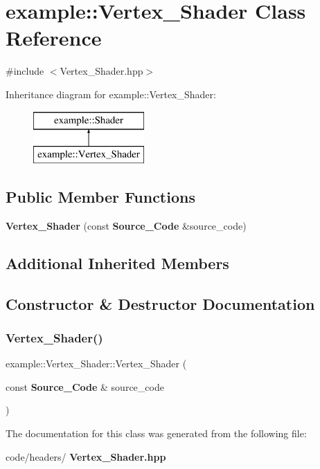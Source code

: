 \section{example\+::Vertex\+\_\+\+Shader Class Reference}
\label{classexample_1_1_vertex___shader}


{\ttfamily \#include $<$Vertex\+\_\+\+Shader.\+hpp$>$}

Inheritance diagram for example\+::Vertex\+\_\+\+Shader\+:\begin{figure}[H]
\begin{center}
\leavevmode
\includegraphics[height=2.000000cm]{classexample_1_1_vertex___shader}
\end{center}
\end{figure}
\subsection*{Public Member Functions}
\begin{DoxyCompactItemize}
\item 
\textbf{ Vertex\+\_\+\+Shader} (const \textbf{ Source\+\_\+\+Code} \&source\+\_\+code)
\end{DoxyCompactItemize}
\subsection*{Additional Inherited Members}


\subsection{Constructor \& Destructor Documentation}
\mbox{\label{classexample_1_1_vertex___shader_a4c9c616101a9c97e61a2e5c1563cdda7}} 
\subsubsection{Vertex\_Shader()}
{\footnotesize\ttfamily example\+::\+Vertex\+\_\+\+Shader\+::\+Vertex\+\_\+\+Shader (\begin{DoxyParamCaption}\item[{const \textbf{ Source\+\_\+\+Code} \&}]{source\+\_\+code }\end{DoxyParamCaption})\hspace{0.3cm}{\ttfamily [inline]}}



The documentation for this class was generated from the following file\+:\begin{DoxyCompactItemize}
\item 
code/headers/\textbf{ Vertex\+\_\+\+Shader.\+hpp}\end{DoxyCompactItemize}

